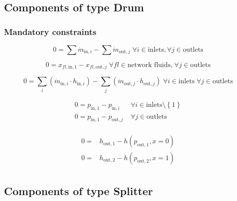 \subsection{Components of type Drum}

\subsubsection{Mandatory constraints}

\begin{equation}
\label{eq:Drum_mass_flow_constraints}
0 =\sum\dot{m}_{\mathrm{in},i}-\sum\dot{m}_{\mathrm{out},j}\;\forall i \in \text{inlets}, \forall j \in \text{outlets}
\end{equation}

\begin{equation}
\label{eq:Drum_fluid_constraints}
0 = x_{fl\mathrm{,in,1}} - x_{fl\mathrm{,out,}j}\; \forall fl \in \text{network fluids,} \; \forall j \in\text{outlets}
\end{equation}

\begin{equation}
\label{eq:Drum_energy_balance_constraints}
0=\sum_i\left(\dot{m}_{\mathrm{in,}i}\cdot h_{\mathrm{in,}i}\right) - \sum_j \left(\dot{m}_{\mathrm{out,}j} \cdot h_{\mathrm{out,}j} \right) \; \forall i \in \text{inlets} \;\forall j \in \text{outlets}
\end{equation}

\begin{equation}
\label{eq:Drum_pressure_constraints}
\begin{split}
0 = p_\mathrm{in,1} - p_{\mathrm{in,}i} & \; \forall i \in \text{inlets} \setminus \left\lbrace 1\right\rbrace\\
0 = p_\mathrm{in,1} - p_{\mathrm{out,}j} & \; \forall j \in \text{outlets}\\
\end{split}
\end{equation}

\begin{equation}
\label{eq:Drum_outlet_constraints}
\begin{split}
0 =&h_\mathrm{out,1} -h\left(p_\mathrm{out,1}, x=0\right)\\0 =&h_\mathrm{out,2} -h\left(p_\mathrm{out,2}, x=1\right)\\\end{split}
\end{equation}


\subsection{Components of type Splitter}

